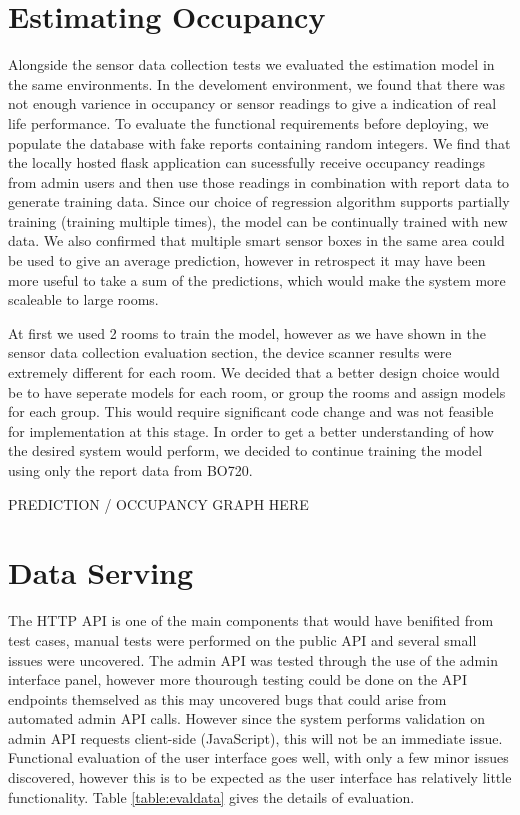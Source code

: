 \documentclass{l4proj}
\begin{document}
\section{Estimating Occupancy}

Alongside the sensor data collection tests we evaluated the estimation model in the same environments. In the develoment environment, we found that there was not enough varience in occupancy or sensor readings to give a indication of real life performance. To evaluate the functional requirements before deploying, we populate the database with fake reports containing random integers. We find that the locally hosted flask application can sucessfully receive occupancy readings from admin users and then use those readings in combination with report data to generate training data. Since our choice of regression algorithm supports partially training (training multiple times), the model can be continually trained with new data. We also confirmed that multiple smart sensor boxes in the same area could be used to give an average prediction, however in retrospect it may have been more useful to take a sum of the predictions, which would make the system more scaleable to large rooms.

At first we used 2 rooms to train the model, however as we have shown in the sensor data collection evaluation section, the device scanner results were extremely different for each room. We decided that a better design choice would be to have seperate models for each room, or group the rooms and assign models for each group. This would require significant code change and was not feasible for implementation at this stage. In order to get a better understanding of how the desired system would perform, we decided to continue training the model using only the report data from BO720. 

PREDICTION / OCCUPANCY GRAPH HERE


\section{Data Serving}

The HTTP API is one of the main components that would have benifited from test cases, manual tests were performed on the public API and several small issues were uncovered. The admin API was tested through the use of the admin interface panel, however more thourough testing could be done on the API endpoints themselved as this may uncovered bugs that could arise from automated admin API calls. However since the system performs validation on admin API requests client-side (JavaScript), this will not be an immediate issue. Functional evaluation of the user interface goes well, with only a few minor issues discovered, however this is to be expected as the user interface has relatively little functionality. Table \ref{table:evaldata} gives the details of evaluation. 
\end{document}
